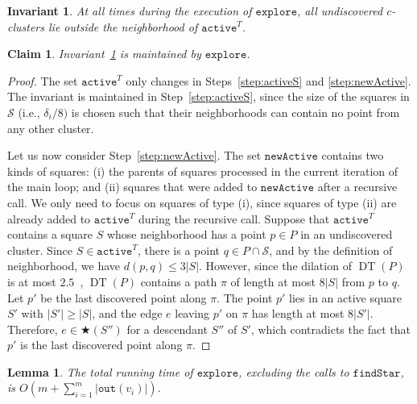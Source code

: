 \documentclass[11pt]{paper}
\DeclareMathOperator {\DT}{DT}
\newtheorem {lem}[theorem] {Lemma}
\newtheorem {claim}[theorem] {Claim}
\newtheorem {invariant}[theorem] {Invariant}
\begin{document}
\begin{invariant}\label{inv:neighborhood}
At all times during the execution of \emph{$\texttt{explore}$},
all undiscovered $c$-clusters lie outside the neighborhood of
\emph{$\texttt{active}^T$}.
\end{invariant}

\begin{claim}\label{clm:invariant}
Invariant~\ref{inv:neighborhood} is maintained by \emph{$\texttt{explore}$}.
\end{claim}

\begin{proof}
The set $\texttt{active}^T$ only changes in Steps~\ref{step:activeS} and
\ref{step:newActive}. The invariant is maintained in
Step~\ref{step:activeS}, since the size of the squares in $\mathcal{S}$ 
(i.e., $\delta_i/8)$ is chosen such that their neighborhoods 
can contain no point from any other cluster. 

Let us now consider Step~\ref{step:newActive}. The
set $\texttt{newActive}$ contains two kinds of squares:
(i) the parents of squares processed in the current iteration
of the main loop; and (ii) squares that were added to
$\texttt{newActive}$ after a recursive call. We only need
to focus on squares of type (i), since squares of type (ii)
are already added to $\texttt{active}^T$ during the recursive
call.
Suppose that $\texttt{active}^T$ contains a square $S$ whose neighborhood
has a point $p \in P$ in an undiscovered cluster. Since $S \in
\texttt{active}^T$,
there is a point $q \in P \cap \mathcal{S}$, and by the definition
of neighborhood, we have $d(p,q) \leq 3|S|$.
However, since the dilation of $\DT(P)$ is at most
$2.5$~\cite{KeilGu92}, $\DT(P)$ contains a path $\pi$ of length at most
$8|S|$ from $p$ to $q$. Let
$p'$ be the last discovered point along $\pi$. The point $p'$ lies
in an active square $S'$ with $|S'| \geq |S|$, and the edge $e$ leaving
$p'$ on $\pi$ has length at most $8|S'|$. Therefore,
$e \in \bigstar(S'')$  for a descendant $S''$ of $S'$, which
contradicts the fact that $p'$ is the last discovered point along
$\pi$.
\end{proof}

\begin{lem}\label{lem:node-explore}
The total running time of \emph{$\texttt{explore}$}, excluding the
calls to \emph{$\texttt{findStar}$}, is 
\emph{$O(m + \sum_{i=1}^{m} |\texttt{out}(v_i)|)$}.
\end{lem}
\end{document}
